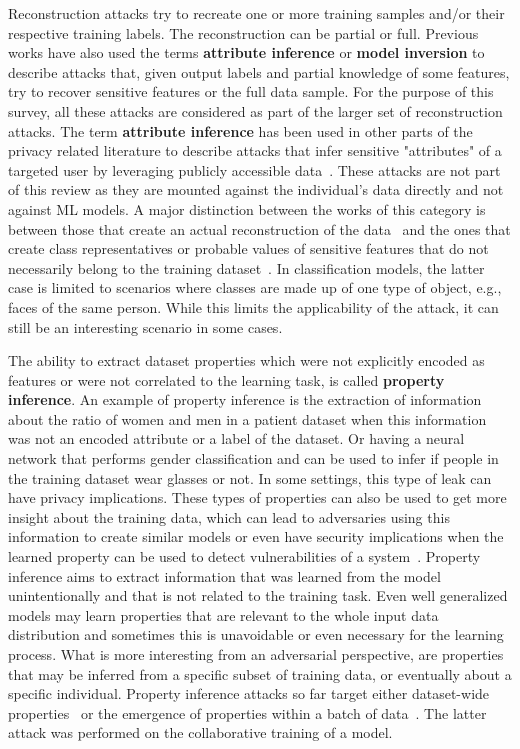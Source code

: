 Reconstruction attacks try to recreate one or more training samples and/or their respective training labels. The reconstruction can be partial or full. Previous works have also used the terms \textbf{attribute inference} or \textbf{model inversion} to describe attacks that, given output labels and partial knowledge of some features, try to recover sensitive features or the full data sample. For the purpose of this survey, all these attacks are considered as part of the larger set of reconstruction attacks. The term \textbf{attribute inference} has been used in other parts of the privacy related literature to describe attacks that infer sensitive "attributes" of a targeted user by leveraging publicly accessible data~. These attacks are not part of this review as they are mounted against the individual's data directly and not against ML models.
A major distinction between the works of this category is between those that create an actual reconstruction of the data~ and the ones that create class representatives or probable values of sensitive features that do not necessarily belong to the training dataset~. In classification models, the latter case is limited to scenarios where classes are made up of one type of object, e.g., faces of the same person. While this limits the applicability of the attack, it can still be an interesting scenario in some cases.

The ability to extract dataset properties which were not explicitly encoded as features or were not correlated to the learning task, is called \textbf{property inference}. An example of property inference is the extraction of information about the ratio of women and men in a patient dataset when this information was not an encoded attribute or a label of the dataset. Or having a neural network that performs gender classification and can be used to infer if people in the training dataset wear glasses or not. In some settings, this type of leak can have privacy implications. These types of properties can also be used to get more insight about the training data, which can lead to adversaries using this information to create similar models  or even have security implications when the learned property can be used to detect vulnerabilities of a system~. 
Property inference aims to extract information that was learned from the model unintentionally and that is not related to the training task. Even well generalized models may learn properties that are relevant to the whole input data distribution and sometimes this is unavoidable or even necessary for the learning process. What is more interesting from an adversarial perspective, are properties that may be inferred from a specific subset of training data, or eventually about a specific individual.
Property inference attacks so far target either dataset-wide properties~ or the emergence of properties within a batch of data~. The latter attack was performed on the collaborative training of a model.

